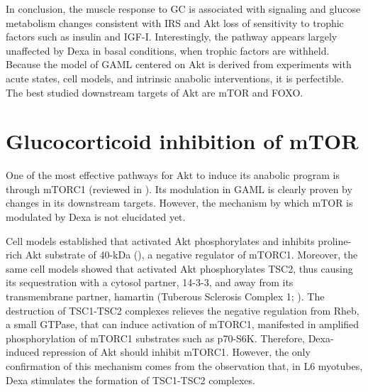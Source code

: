 \documentclass[12pt,english]{report}\usepackage[]{graphicx}\usepackage[]{color}
\begin{document}
In conclusion, the muscle response to GC is associated with signaling
and glucose metabolism changes consistent with IRS and Akt loss of
sensitivity to trophic factors such as insulin and IGF-I. Interestingly,
the pathway appears largely unaffected by Dexa in basal conditions,
when trophic factors are withheld. Because the model of GAML centered
on Akt is derived from experiments with acute states, cell models,
and intrinsic anabolic interventions, it is perfectible. The best
studied downstream targets of Akt are mTOR and FOXO.


\section{Glucocorticoid inhibition of mTOR}

One of the most effective pathways for Akt to induce its anabolic
program is through mTORC1 (reviewed in \citep{guertin2007defining,laplante2009mtor,inoki2002tsc2}).
Its modulation in GAML is clearly proven by changes in its downstream
targets. However, the mechanism by which mTOR is modulated by Dexa
is not elucidated yet.

Cell models established that activated Akt phosphorylates and inhibits
proline-rich Akt substrate of 40-kDa (),
a negative regulator of mTORC1\citep{sancak2007pras40}. Moreover,
the same cell models showed that activated Akt phosphorylates TSC2,
thus causing its sequestration with a cytosol partner, 14-3-3, and
away from its transmembrane partner, hamartin (Tuberous Sclerosis
Complex 1; )\citep{cai2006activity}.
The destruction of TSC1-TSC2 complexes relieves the negative regulation
from Rheb, a small GTPase, that can induce activation of mTORC1, manifested
in amplified phosphorylation of mTORC1 substrates such as p70-S6K.
Therefore, Dexa-induced repression of Akt should inhibit mTORC1. However,
the only confirmation of this mechanism comes from the observation
that, in L6 myotubes, Dexa stimulates the formation of TSC1-TSC2 complexes\citep{wang2006dexamethasone}.
\end{document}
